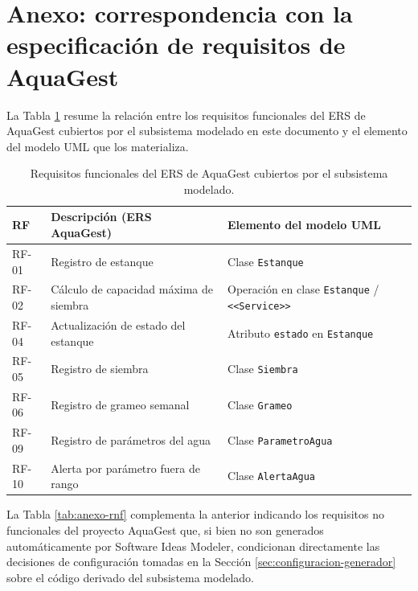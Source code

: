 \documentclass[11pt,a4paper]{article}
\begin{document}
\section{Anexo: correspondencia con la especificación de requisitos de AquaGest}

La Tabla \ref{tab:anexo-rf} resume la relación entre los requisitos funcionales del ERS de AquaGest cubiertos por el subsistema modelado en este documento y el elemento del modelo UML que los materializa.

\begin{table}[H]
\centering
\caption{Requisitos funcionales del ERS de AquaGest cubiertos por el subsistema modelado.}
\label{tab:anexo-rf}
\begin{tabular}{p{1.6cm}p{6.5cm}p{4.2cm}}
\toprule
\textbf{RF} & \textbf{Descripción (ERS AquaGest)} & \textbf{Elemento del modelo UML} \\
\midrule
RF-01 & Registro de estanque & Clase \texttt{Estanque} \\
RF-02 & Cálculo de capacidad máxima de siembra & Operación en clase \texttt{Estanque} / \texttt{<<Service>>} \\
RF-04 & Actualización de estado del estanque & Atributo \texttt{estado} en \texttt{Estanque} \\
RF-05 & Registro de siembra & Clase \texttt{Siembra} \\
RF-06 & Registro de grameo semanal & Clase \texttt{Grameo} \\
RF-09 & Registro de parámetros del agua & Clase \texttt{ParametroAgua} \\
RF-10 & Alerta por parámetro fuera de rango & Clase \texttt{AlertaAgua} \\
\bottomrule
\end{tabular}
\end{table}

La Tabla \ref{tab:anexo-rnf} complementa la anterior indicando los requisitos no funcionales del proyecto AquaGest que, si bien no son generados automáticamente por Software Ideas Modeler, condicionan directamente las decisiones de configuración tomadas en la Sección \ref{sec:configuracion-generador} sobre el código derivado del subsistema modelado.
\end{document}
